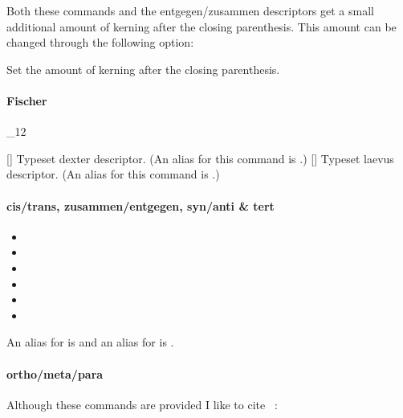 \documentclass[load-preamble+]{cnltx-doc}
\makeatletter
\renewenvironment{commands}
  {%
    \cnltx@set@catcode_{12}%
    \let\command\cnltx@command
    \cnltxlist
  }
  {\endcnltxlist}
\makeatother
\begin{document}
Both these commands and the entgegen/zusammen descriptors get a small
additional amount of kerning after the closing parenthesis.  This amount can
be changed through the following option:
\begin{options}
  \Default{.075em}
    Set the amount of kerning after the closing parenthesis.
\end{options}

\paragraph{Fischer}
\begin{commands}
  \command{dexter}[\quad\iupac{\dexter}]
    Typeset dexter descriptor.  (An alias for this command is .)
  \command{laevus}[\quad\iupac{\laevus}]
    Typeset laevus descriptor.  (An alias for this command is .)
\end{commands}

\paragraph{cis/trans, zusammen/entgegen, syn/anti \& tert}
\begin{itemize}
  \item {}   \iupac{\cis} \quad {} \iupac{\trans}
  \item {}   \iupac{\fac} \quad {}   \iupac{\mer}
  \item {}   \iupac{\sin} \quad {}   \iupac{\ter}
  \item {} \iupac{\zusammen} \quad {} \iupac{\entgegen}
  \item {}   \iupac{\syn} \quad {}  \iupac{\anti}
  \item {}  \iupac{\tert}
\end{itemize}
An alias for  is  and an alias for  is
.

\paragraph{ortho/meta/para}
\begin{center}
     \iupac{\ortho} \quad
      \iupac{\meta} \quad
      \iupac{\para}
\end{center}

Although these commands are provided I like to cite
~\cite{iupac:bluebook}:
\end{document}
